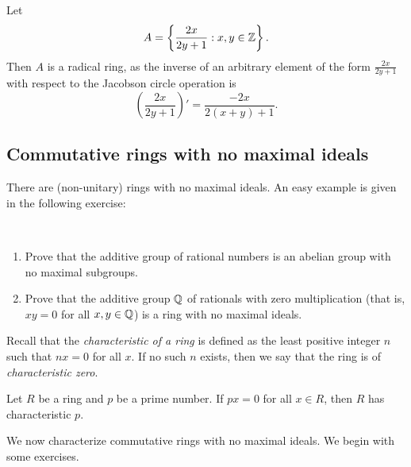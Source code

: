 \begin{example}
	Let 
	\[
	A=\left\{\frac{2x}{2y+1}:x,y\in\mathbb{Z}\right\}.
	\]
	Then $A$ is a radical ring, as the inverse of an arbitrary element of the form $\frac{2x}{2y+1}$
	with respect to the Jacobson circle operation 
	is 
    \[
	\left(\frac{2x}{2y+1}\right)'=\frac{-2x}{2(x+y)+1}.
	\]
\end{example}

\subsection{Commutative rings with no maximal ideals}

There are (non-unitary) rings with no maximal ideals. An easy example is given in the following exercise: 

\begin{exercise}\
\label{xca:Q_no_maximals}
    \begin{enumerate}
        \item Prove that the additive group of rational numbers is an abelian group
            with no maximal subgroups.
        \item Prove that the additive group $\mathbb{Q}$ of rationals with  
            zero multiplication (that is, $xy=0$ for all $x,y\in\mathbb{Q}$) is a ring with no maximal ideals. 
    \end{enumerate}
\end{exercise}

Recall that the \emph{characteristic of a ring} is defined as the least positive
integer $n$ such that $nx=0$ for all $x$. If no such $n$ exists, 
then we say that the ring is of \emph{characteristic zero}. 

\begin{exercise}
\label{xca:characteristic}
    Let $R$ be a ring and $p$ be a prime number. 
    If $px=0$ for all $x\in R$, then $R$ has characteristic $p$. 
\end{exercise}

We now characterize commutative rings with no maximal ideals.
We begin with some exercises. 


